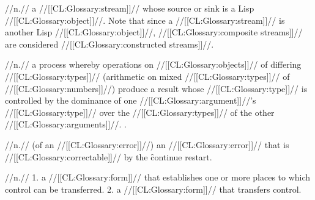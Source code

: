  //n.// a //[[CL:Glossary:stream]]// whose source or sink is a Lisp //[[CL:Glossary:object]]//. Note that since a //[[CL:Glossary:stream]]// is another Lisp //[[CL:Glossary:object]]//, //[[CL:Glossary:composite streams]]// are considered //[[CL:Glossary:constructed streams]]//. 

 //n.// a process whereby operations on //[[CL:Glossary:objects]]// of differing //[[CL:Glossary:types]]// (\eg arithmetic on mixed //[[CL:Glossary:types]]// of //[[CL:Glossary:numbers]]//) produce a result whose //[[CL:Glossary:type]]// is controlled by the dominance of one //[[CL:Glossary:argument]]//'s //[[CL:Glossary:type]]// over the //[[CL:Glossary:types]]// of the other //[[CL:Glossary:arguments]]//. \Seesection\NumericContagionRules.

 //n.// (of an //[[CL:Glossary:error]]//) an //[[CL:Glossary:error]]// that is //[[CL:Glossary:correctable]]// by the \f{continue} restart.

 //n.// 1. a //[[CL:Glossary:form]]// that establishes one or more places to which control can be transferred. 2. a //[[CL:Glossary:form]]// that transfers control.

